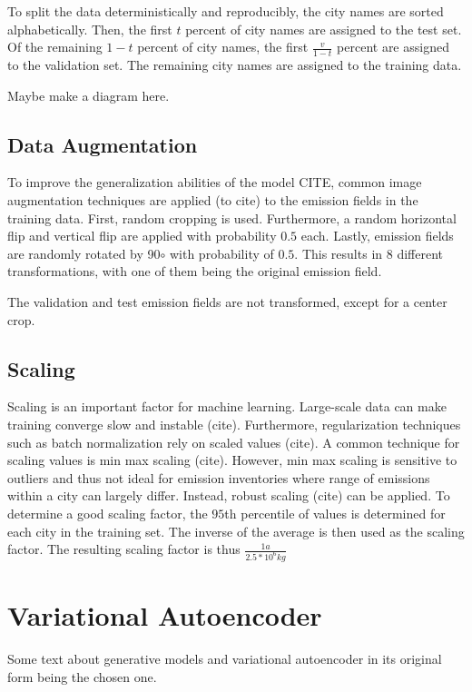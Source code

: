 To split the data deterministically and reproducibly, the city names are sorted alphabetically.
Then, the first $t$ percent of city names are assigned to the test set.
Of the remaining $1 - t$ percent of city names, the first $\frac{v}{1 - t}$ percent are assigned to the validation set.
The remaining city names are assigned to the training data.

Maybe make a diagram here.

\subsection{Data Augmentation}
To improve the generalization abilities of the model CITE, common image augmentation techniques are applied (to cite) to the emission fields in the training data.
First, random cropping is used.
Furthermore, a random horizontal flip and vertical flip are applied with probability $0.5$ each.
Lastly, emission fields are randomly rotated by 90$\circ$ with probability of $0.5$.
This results in $8$ different transformations, with one of them being the original emission field.

The validation and test emission fields are not transformed, except for a center crop.

\subsection{Scaling}
Scaling is an important factor for machine learning.
Large-scale data can make training converge slow and instable (cite).
Furthermore, regularization techniques such as batch normalization \parencite{BatchNorm} rely on scaled values (cite).
A common technique for scaling values is min max scaling (cite).
However, min max scaling is sensitive to outliers and thus not ideal for emission inventories where range of emissions within a city can largely differ.
Instead, robust scaling (cite) can be applied.
To determine a good scaling factor, the $95$th percentile of values is determined for each city in the training set.
The inverse of the average is then used as the scaling factor.
The resulting scaling factor is thus $\frac{1 a}{2.5 * 10^6 kg}$

\section{Variational Autoencoder}
Some text about generative models and variational autoencoder \parencite{VAE} in its original form being the chosen one.

